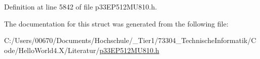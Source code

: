 Definition at line 5842 of file p33\+E\+P512\+M\+U810.\+h.



The documentation for this struct was generated from the following file\+:\begin{DoxyCompactItemize}
\item 
C\+:/\+Users/00670/\+Documents/\+Hochschule/\+\_\+\+Tier1/73304\+\_\+\+Technische\+Informatik/\+Code/\+Hello\+World4.\+X/\+Literatur/\hyperlink{p33_e_p512_m_u810_8h}{p33\+E\+P512\+M\+U810.\+h}\end{DoxyCompactItemize}
